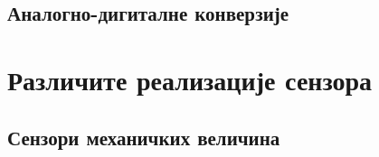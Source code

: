 \setcounter{fid}{0}
\graphicspath{{./3_if_kola/1_op/}}
\noindent

\vspace*{\ProblemSep}
\goodbreak


\setcounter{fid}{0}
\graphicspath{{./3_if_kola/1_op/}}
\noindent

\vspace*{\ProblemSep}
\goodbreak


\setcounter{fid}{0}
\graphicspath{{./3_if_kola/1_op/}}
\noindent

\vspace*{\ProblemSep}
\goodbreak


\setcounter{fid}{0}
\graphicspath{{./3_if_kola/1_op/}}
\noindent

\vspace*{\ProblemSep}
\goodbreak


\setcounter{fid}{0}
\graphicspath{{./3_if_kola/1_op/}}
\noindent

\vspace*{\ProblemSep}
\goodbreak


\setcounter{fid}{0}
\graphicspath{{./3_if_kola/1_op/}}
\noindent

\vspace*{\ProblemSep}
\goodbreak


\setcounter{fid}{0}
\graphicspath{{./3_if_kola/1_op/}}
\noindent

\vspace*{\ProblemSep}
\goodbreak
\subsection{Аналогно-дигиталне конверзије
}


\setcounter{fid}{0}
\graphicspath{{./3_if_kola/2_ad_da/}}
\noindent

\vspace*{\ProblemSep}
\goodbreak


\setcounter{fid}{0}
\graphicspath{{./3_if_kola/2_ad_da/}}
\noindent

\vspace*{\ProblemSep}
\goodbreak
\section{Различите реализације сензора}
\subsection{Сензори механичких величина}



